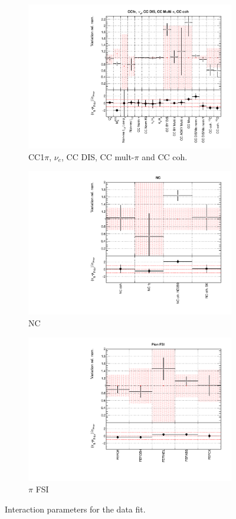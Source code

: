 \begin{figure}
\begin{subfigure}{0.49\textwidth}
  \centering
  \includegraphics[width=0.9\linewidth]{figs/datxsec3}
  \caption{CC1$\pi$, $\nu_e$, CC DIS, CC mult-$\pi$ and CC coh.}
\end{subfigure}
\begin{subfigure}{0.49\textwidth}
  \centering
  \includegraphics[width=0.9\linewidth]{figs/datxsec4}
  \caption{NC}
\end{subfigure}
\begin{subfigure}{0.49\textwidth}
  \centering
  \includegraphics[width=0.9\linewidth]{figs/datxsec5}
  \caption{$\pi$ FSI}
\end{subfigure}
\caption{Interaction parameters for the data fit.}
\label{fig:datxsec}
\end{figure}


